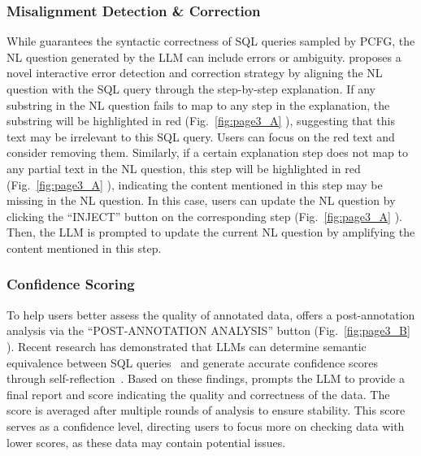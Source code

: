 \subsubsection{Misalignment Detection \& Correction}

While {\tool} guarantees the syntactic correctness of SQL queries sampled by PCFG, the NL question generated by the LLM can include errors or ambiguity.
{\tool} proposes a novel interactive error detection and correction strategy by aligning the NL question with the SQL query through the step-by-step explanation.
If any substring in the NL question fails to map to any step in the explanation, the substring will be highlighted in red (Fig.~\ref{fig:page3_A} ), suggesting that this text may be irrelevant to this SQL query.
Users can focus on the red text and consider removing them.
Similarly, if a certain explanation step does not map to any partial text in the NL question, this step will be highlighted in red (Fig.~\ref{fig:page3_A} ), indicating the content mentioned in this step may be missing in the NL question.
In this case, users can update the NL question by clicking the ``INJECT'' button on the corresponding step (Fig.~\ref{fig:page3_A} ). Then, the LLM is prompted to update the current NL question by amplifying the content mentioned in this step.


\subsubsection{Confidence Scoring}
To help users better assess the quality of annotated data, {\tool} offers a post-annotation analysis via the ``POST-ANNOTATION ANALYSIS'' button (Fig.~\ref{fig:page3_B} ). Recent research has demonstrated that LLMs can determine semantic equivalence between SQL queries~\cite{llm_sql_equivalence} and generate accurate confidence scores through self-reflection~\cite{calibration_and_correctness, tian2023justaskcalibrationstrategies}.
Based on these findings, {\tool} prompts the LLM to provide a final report and score indicating the quality and correctness of the data.  
The score is averaged after multiple rounds of analysis to ensure stability. 
This score serves as a confidence level, directing users to focus more on checking data with lower scores, as these data may contain potential issues.


